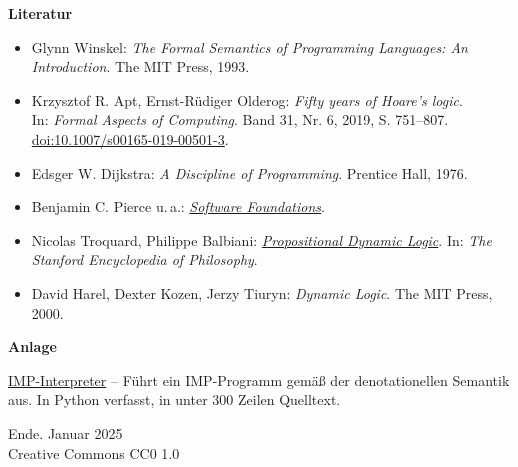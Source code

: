 \documentclass[8pt,fleqn,aspectratio=169]{beamer}
\newcommand{\modest}[1]{{\small\color{gray}#1}}
\newcommand{\strong}[1]{\textsf{\textbf{#1}}}
\newcommand{\parspace}{\vspace{0.8em}}
\begin{document}
\begin{frame}
\strong{Literatur}
\begin{itemize}
\item Glynn Winskel:
  \emph{The Formal Semantics of Programming Languages: An Introduction}.
  The MIT Press, 1993.
\item Krzysztof R. Apt, Ernst-Rüdiger Olderog:
  \emph{Fifty years of Hoare’s logic}.\\
  In: \emph{Formal Aspects of Computing}.
  Band 31, Nr. 6, 2019, S. 751--807.\\
  \href{https://doi.org/10.1007/s00165-019-00501-3}{doi:10.1007/s00165-019-00501-3}.
\item Edsger W. Dijkstra:
  \emph{A Discipline of Programming}. Prentice Hall, 1976.
\item Benjamin C. Pierce u.\,a.:
  \href{https://softwarefoundations.cis.upenn.edu/}{\emph{Software Foundations}}.
\item Nicolas Troquard, Philippe Balbiani:
  \href{https://plato.stanford.edu/entries/logic-dynamic/}{\emph{Propositional Dynamic Logic}}.
  In: \emph{The Stanford Encyclopedia of Philosophy}.
\item David Harel, Dexter Kozen, Jerzy Tiuryn:
  \emph{Dynamic Logic}. The MIT Press, 2000.
\end{itemize}
\end{frame}

\begin{frame}
\strong{Anlage}

\parspace
\href{https://github.com/JohnBSmith/misc/tree/master/cs/imp}{%
IMP-Interpreter} -- Führt ein IMP-Programm gemäß der denotationellen
Semantik aus. In Python verfasst, in unter 300 Zeilen Quelltext.
\end{frame}

\begin{frame}
Ende.
\vfill\hfill\modest{Januar 2025}\\
\hfill\modest{Creative Commons CC0 1.0}
\end{frame}
\end{document}
